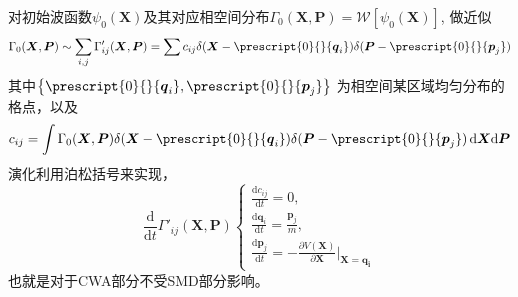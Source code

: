 对初始波函数$\psi_0(\boldsymbol{X})$及其对应相空间分布$ \Gamma_0(\boldsymbol{X}, \boldsymbol{P}) = \mathcal{W}\left[ \psi_0(\boldsymbol{X}) \right] $, 做近似
\begin{equation}
	\Gamma_0 (\boldsymbol{X}, \boldsymbol{P}) \sim \sum_{i,j} \Gamma_{ij}'(\boldsymbol{X}, \boldsymbol{P}) = \sum c_{ij} \delta(\boldsymbol{X} - \prescript{0}{}{\boldsymbol{q}_i}) \delta(\boldsymbol{P} - \prescript{0}{}{\boldsymbol{p}_j})
\end{equation} 
其中$\left\{ \prescript{0}{}{\boldsymbol{q}_i}, \prescript{0}{}{\boldsymbol{p}_j} \right\} $ 为相空间某区域均匀分布的格点，以及
\begin{equation}
	c_{ij} = \int \Gamma_0(\boldsymbol{X}, \boldsymbol{P}) \delta(\boldsymbol{X} - \prescript{0}{}{\boldsymbol{q}_i}) \delta(\boldsymbol{P} - \prescript{0}{}{\boldsymbol{p}_j}) \, \mathrm{d}\boldsymbol{X}\mathrm{d}\boldsymbol{P} 
\end{equation} 
演化利用泊松括号来实现，
\begin{equation}
\frac{\mathrm{d}}{\mathrm{d}t} \Gamma'_{ij}(\boldsymbol{X}, \boldsymbol{P})
\begin{cases}
	\frac{\mathrm{d} c_{ij}}{\mathrm{d} t} = 0 , \\
	\frac{\mathrm{d} \boldsymbol{q}_i}{\mathrm{d} t} = \frac{\boldsymbol{p}_j}{m} , \\
	\frac{\mathrm{d} \boldsymbol{p}_j}{\mathrm{d} t} = - \frac{\partial V(\boldsymbol{X})}{\partial \boldsymbol{X}}\bigg|_{\boldsymbol{X} = \boldsymbol{q_i}}
\end{cases}
\end{equation}
也就是对于CWA部分不受SMD部分影响。

